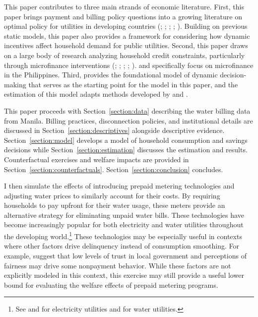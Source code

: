 \documentclass[12pt,table]{article}
\begin{document}
This paper contributes to three main strands of economic literature.  First, this paper brings payment and billing policy questions into a growing literature on optimal policy for utilities in developing countries (\cite{mcrae2015infrastructure}; \cite{szabo2015value}; \cite{jack2016charging}; \cite{jack2015pay}; \cite{szabo2015reducing}).  Building on previous static models, this paper also provides a framework for considering how dynamic incentives affect household demand for public utilities.  Second, this paper draws on a large body of research analyzing household credit constraints, particularly through microfinance interventions (\cite{morduch1999microfinance}; \cite{morduch1995income}; \cite{cull2009microfinance}; \cite{dupas2013savings}; \cite{jack2016borrowing}).  \cite{karlan2009expanding} and \cite{gine2014group} specifically focus on microfinance in the Philippines. Third, \cite{deaton1991saving} provides the foundational model of dynamic decision-making that serves as the starting point for the model in this paper, and the estimation of this model adapts methods developed by \cite{gourinchas2002consumption} and \cite{laibson2007estimating}.

This paper proceeds with Section~\ref{section:data} describing the water billing data from Manila.  Billing practices, disconnection policies, and institutional details are discussed in Section~\ref{section:descriptives} alongside descriptive evidence.  Section~\ref{section:model} develops a model of household consumption and savings decisions while Section~\ref{section:estimation} discusses the estimation and results.  Counterfactual exercises and welfare impacts are provided in Section~\ref{section:counterfactuals}.  Section~\ref{section:conclusion} concludes. 


I then simulate the effects of introducing prepaid metering technologies and adjusting water prices to similarly account for their costs.  By requiring households to pay upfront for their water usage, these meters provide an alternative strategy for eliminating unpaid water bills.  These technologies have become increasingly popular for both electricity and water utilities throughout the developing world.\footnote{See \cite{jack2016charging} and \cite{northeast2014} for electricity utilities and \cite{heymans2014limits} for water utilities.}  These technologies may be especially useful in contexts where other factors drive delinquency instead of consumption smoothing.   For example, \cite{szabo2015reducing} suggest that low levels of trust in local government and perceptions of fairness may drive some nonpayment behavior.  While these factors are not explicitly modeled in this context, this exercise may still provide a useful lower bound for evaluating the welfare effects of prepaid metering programs.
\end{document}
